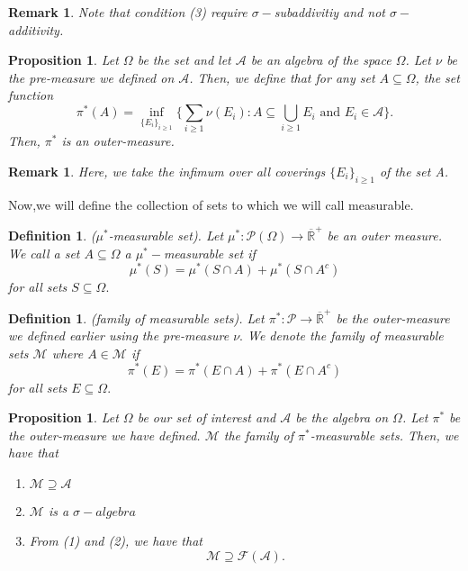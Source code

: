\documentclass[twoside]{article}
\newtheorem{proposition}[theorem]{Proposition}
\newtheorem{definition}[theorem]{Definition}
\newtheorem{remark}[theorem]{Remark}
\newcommand{\algebra}{\mathcal{A}}
\newcommand{\sigmalgebra}{\mathcal{F}}
\newcommand{\sa}{\sigma-algebra}
\newcommand{\powerset}{\mathcal{P}}
\newcommand{\positiveextendedreal}{\overline{\mathbb{R}}^+}
\begin{document}
\begin{remark}Note that condition (3) require $\sigma-$subaddivitiy and not $\sigma-$additivity.
\end{remark}


\begin{proposition}Let $\Omega$ be the set and let $\algebra$ be an algebra of the space $\Omega$. Let $\nu$ be the pre-measure we defined on $\algebra$. Then, we define that for any set $A \subseteq \Omega$, the set function
$$
\pi^*(A) = \inf_{ \{E_i\}_{i \geq 1} } \bigg\{\sum_{i \geq 1}\nu(E_i): A \subseteq \bigcup_{i \geq 1}E_i \text{ and } E_i \in \algebra \bigg\}.
$$
Then, $\pi^*$ is an outer-measure.
\end{proposition}

\begin{remark}Here, we take the infimum over all coverings $\{E_i\}_{i \geq 1}$ of the set A.
\end{remark}

Now,we will define the collection of sets to which we will call measurable.

\begin{definition}($\mu^*$-measurable set). Let $\mu^*: \powerset(\Omega) \rightarrow \positiveextendedreal$ be an outer measure. We call a set $A \subseteq \Omega$ a $\mu^*-$measurable set if 
$$
\mu^*(S) = \mu^*(S \cap A) + \mu^*(S \cap A^c)
$$
for all sets $S \subseteq \Omega.$ 
\end{definition}

\begin{definition}(family of measurable sets). Let $\pi^*: \powerset \rightarrow \positiveextendedreal$ be the outer-measure we defined earlier using the pre-measure $\nu.$ We denote the family of measurable sets $\mathcal{M}$ where $A \in \mathcal{M}$ if
$$
\pi^*(E) = \pi^*(E \cap A) + \pi^*(E \cap A^c)
$$
for all sets $E \subseteq \Omega.$
\end{definition}

\begin{proposition}Let $\Omega$ be our set of interest and $\algebra$ be the algebra on $\Omega$. Let $\pi^*$ be the outer-measure we have defined. $\mathcal{M}$ the family of $\pi^*$-measurable sets. Then, we have that 
\begin{enumerate}
\item $\mathcal{M} \supseteq \mathcal{A}$
\item $\mathcal{M}$ is a $\sa$
\item From (1) and (2), we have that 
$$
\mathcal{M} \supseteq \sigmalgebra (\algebra).
$$
\end{enumerate}
\end{proposition}
\end{document}
